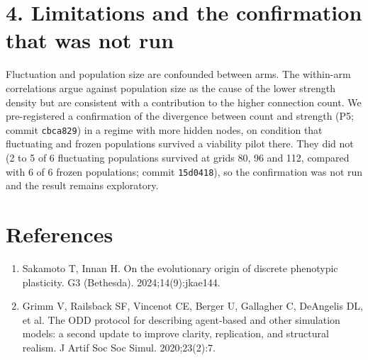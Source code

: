 \section*{4. Limitations and the confirmation that was not run}
Fluctuation and population size are confounded between arms. The within-arm
correlations argue against population size as the cause of the lower strength
density but are consistent with a contribution to the higher connection count.
We pre-registered a confirmation of the divergence between count and strength
(P5; commit \texttt{cbca829}) in a regime with more hidden nodes, on condition
that fluctuating and frozen populations survived a viability pilot there.
They did not (2 to 5 of 6 fluctuating populations survived at grids 80, 96 and
112, compared with 6 of 6 frozen populations; commit \texttt{15d0418}), so the
confirmation was not run and the result remains exploratory.

\section*{References}
\small
\begin{enumerate}\setlength{\itemsep}{1pt}
\item Sakamoto T, Innan H. On the evolutionary origin of discrete phenotypic plasticity. G3 (Bethesda). 2024;14(9):jkae144.
\item Grimm V, Railsback SF, Vincenot CE, Berger U, Gallagher C, DeAngelis DL, et al. The ODD protocol for describing agent-based and other simulation models: a second update to improve clarity, replication, and structural realism. J Artif Soc Soc Simul. 2020;23(2):7.
\end{enumerate}


